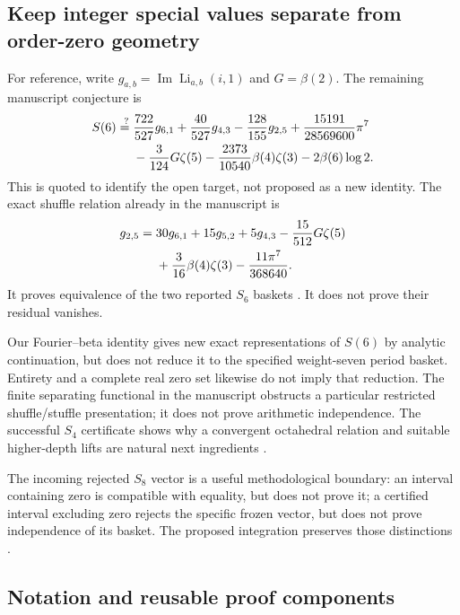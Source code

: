 \subsection{Keep integer special values separate from order-zero geometry}

For reference, write
$g_{a,b}=\operatorname{Im}\operatorname{Li}_{a,b}(i,1)$ and
$G=\beta(2)$. The remaining manuscript conjecture is
\begin{align}
 S(6)\stackrel{?}{={}}&
 \frac{722}{527}g_{6,1}+\frac{40}{527}g_{4,3}
 -\frac{128}{155}g_{2,5}+\frac{15191}{28569600}\pi^7
 \notag\\
 &-\frac3{124}G\zeta(5)
 -\frac{2373}{10540}\beta(4)\zeta(3)
 -2\beta(6)\log2 .
 \label{eq:retained-S6}
\end{align}
This is quoted to identify the open target, not proposed as a new
identity. The exact shuffle relation already in the manuscript is
\begin{align}
 g_{2,5}={}&30g_{6,1}+15g_{5,2}+5g_{4,3}
 -\frac{15}{512}G\zeta(5)\notag\\
 &+\frac3{16}\beta(4)\zeta(3)-\frac{11\pi^7}{368640}.
 \label{eq:retained-basket-change}
\end{align}
It proves equivalence of the two reported $S_6$ baskets
\cite{ProjectQuotients}. It does not prove their residual vanishes.

Our Fourier--beta identity gives new exact representations of $S(6)$
by analytic continuation, but does not reduce it to the specified
weight-seven period basket. Entirety and a complete real zero set
likewise do not imply that reduction. The finite separating functional
in the manuscript obstructs a particular restricted
shuffle/stuffle presentation; it does not prove arithmetic independence.
The successful $S_4$ certificate shows why a convergent octahedral
relation and suitable higher-depth lifts are natural next ingredients
\cite{ProjectS4,ProjectQuotients}.

The incoming rejected $S_8$ vector is a useful methodological boundary:
an interval containing zero is compatible with equality, but does not
prove it; a certified interval excluding zero rejects the specific
frozen vector, but does not prove independence of its basket.
The proposed integration preserves those distinctions
\cite{ProjectDiscovery}.

\subsection{Notation and reusable proof components}

